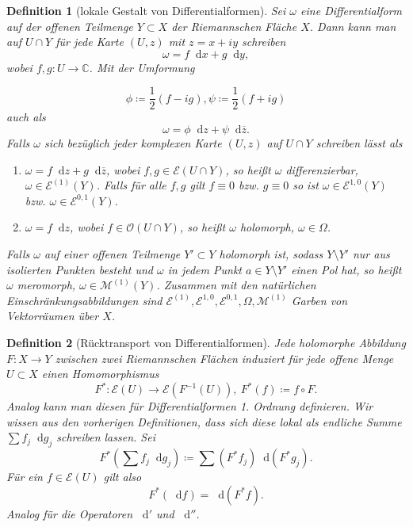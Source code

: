 \documentclass[11pt,a4paper,toc=bibliography]{scrartcl}
\theoremstyle{thm}
\theoremstyle{def}
\newtheorem{defi}{Definition}[section]
\theoremstyle{remark}
\newcommand*\dif{\mathop{}\!\mathrm{d}}
\begin{document}
\begin{defi}[lokale Gestalt von Differentialformen]
Sei $\omega $ eine Differentialform auf der offenen Teilmenge $Y\subset X$ der Riemannschen Fläche $X$. Dann kann man auf $U\cap Y$ für jede Karte $(U,z)$ mit $z=x+iy$ schreiben
\[
\omega = f\dif x+g\dif y,
\]
wobei $f,g:U\rightarrow \mathbb{C}$. Mit der Umformung

	\[
\phi \coloneqq \frac{1}{2}\left(f-ig\right), \psi \coloneqq \frac{1}{2}\left(f+ig\right)
\]  
auch als
\[
\omega = \phi\dif z+\psi\dif\overline{z}.
\]
Falls $\omega $ sich bezüglich jeder komplexen Karte $(U,z)$ auf $U\cap Y$ schreiben lässt als
\begin{enumerate}
	\item $\omega = f\dif z+g\dif \overline{z}$, wobei $f,g\in \mathcal{E}(U\cap Y)$, so heißt $\omega$ \emph{differenzierbar}, $\omega\in \mathcal{E}^{(1)}(Y)$. Falls für alle $f,g$ gilt $f\equiv 0$ bzw. $g\equiv 0$ so ist $\omega \in \mathcal{E}^{1,0}(Y)$ bzw. $\omega \in \mathcal{E}^{0,1}(Y)$.
	\item $\omega = f\dif z$, wobei $f\in\mathcal{O}(U\cap Y)$, so heißt $\omega$ \emph{holomorph},
	$\omega\in \Omega$.
\end{enumerate}
Falls $\omega$ auf einer offenen Teilmenge $Y'\subset Y$ holomorph ist, sodass $Y\setminus Y'$ nur aus isolierten Punkten besteht und $\omega$ in jedem Punkt $a\in Y\setminus Y'$ einen Pol hat, so heißt $\omega$ \emph{meromorph}, $\omega \in \mathcal{M}^{(1)}(Y)$.
Zusammen mit den natürlichen Einschränkungsabbildungen sind $\mathcal{E}^{(1)},\mathcal{E}^{1,0},\mathcal{E}^{0,1},\Omega,\mathcal{M}^{(1)} $ Garben von Vektorräumen über $X$.
\end{defi}

 \begin{defi}[Rücktransport von Differentialformen]
 	Jede holomorphe Abbildung $F:X\rightarrow Y$ zwischen zwei Riemannschen Flächen induziert für jede offene Menge $U\subset X$ einen Homomorphismus
 	\[
 	F^*:\mathcal{E}(U)\rightarrow \mathcal{E}(F^{-1}(U)),~F^*(f)\coloneqq f\circ F.
 	\]
 	Analog kann man diesen für Differentialformen 1. Ordnung definieren. Wir wissen aus den vorherigen Definitionen, dass sich diese lokal als endliche Summe $\sum f_j\dif g_j$ schreiben lassen. Sei
 	\[
 	F^*(\sum f_j\dif g_j)\coloneqq \sum (F^*f_j)\dif(F^*g_j).
 	\]
 	Für ein $f\in\mathcal{E}(U)$ gilt also
 	\[
 	F^*(\dif f) = \dif (F^*f).
 	\]
 	Analog für die Operatoren $\dif'$ und $\dif''$.
 \end{defi}
\end{document}
